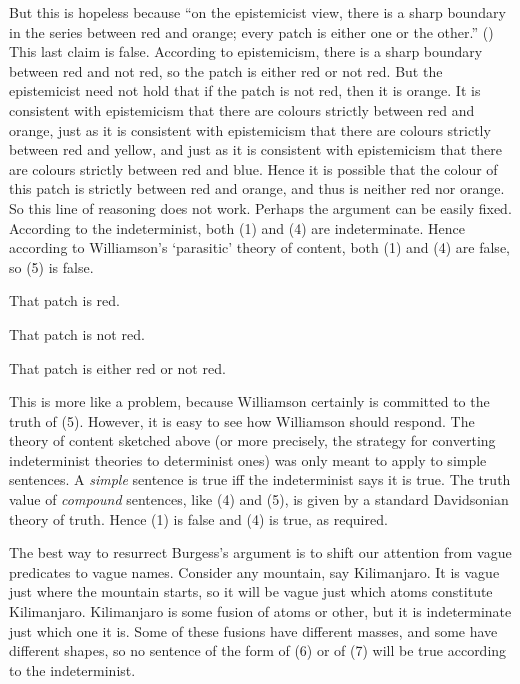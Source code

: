 \documentclass[
  11pt,
  letterpaper,
  DIV=11,
  numbers=noendperiod,
  twoside]{scrartcl}
\providecommand{\tightlist}{%
  \setlength{\itemsep}{0pt}\setlength{\parskip}{0pt}}
\begin{document}
But this is hopeless because ``on the epistemicist view, there is a
sharp boundary in the series between red and orange; every patch is
either one or the other.'' () This last claim is false. According to epistemicism, there is a
sharp boundary between red and not red, so the patch is either red or
not red. But the epistemicist need not hold that if the patch is not
red, then it is orange. It is consistent with epistemicism that there
are colours strictly between red and orange, just as it is consistent
with epistemicism that there are colours strictly between red and
yellow, and just as it is consistent with epistemicism that there are
colours strictly between red and blue. Hence it is possible that the
colour of this patch is strictly between red and orange, and thus is
neither red nor orange. So this line of reasoning does not work. Perhaps
the argument can be easily fixed. According to the indeterminist, both
(1) and (4) are indeterminate. Hence according to Williamson's
`parasitic' theory of content, both (1) and (4) are false, so (5) is
false.

\begin{description}
\tightlist
\item[(1)]
That patch is red.
\item[(4)]
That patch is not red.
\item[(5)]
That patch is either red or not red.
\end{description}

This is more like a problem, because Williamson certainly is committed
to the truth of (5). However, it is easy to see how Williamson should
respond. The theory of content sketched above (or more precisely, the
strategy for converting indeterminist theories to determinist ones) was
only meant to apply to simple sentences. A \emph{simple} sentence is
true iff the indeterminist says it is true. The truth value of
\emph{compound} sentences, like (4) and (5), is given by a standard
Davidsonian theory of truth. Hence (1) is false and (4) is true, as
required.

The best way to resurrect Burgess's argument is to shift our attention
from vague predicates to vague names. Consider any mountain, say
Kilimanjaro. It is vague just where the mountain starts, so it will be
vague just which atoms constitute Kilimanjaro. Kilimanjaro is some
fusion of atoms or other, but it is indeterminate just which one it is.
Some of these fusions have different masses, and some have different
shapes, so no sentence of the form of (6) or of (7) will be true
according to the indeterminist.
\end{document}
